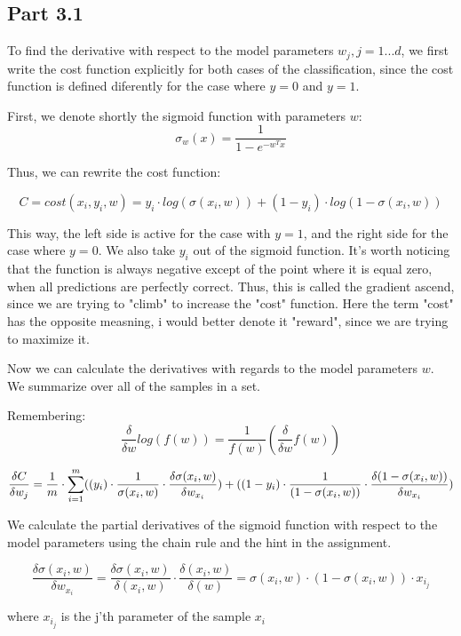 \documentclass[a4paper]{iacas}
\begin{document}
\newpage
\subsection{Part 3.1}

To find the derivative with respect to the model parameters $w_{j}, j = 1... d$, we first write the cost function explicitly for both cases
of the classification, since the cost function is defined diferently for the case where $y = 0$ and $y = 1$.


First, we denote shortly the sigmoid function with parameters $w$:
$$\sigma_{w}(x) = \frac{1}{1 - e^{-w^Tx}}$$

Thus, we can rewrite the cost function:

$$C = cost(x_{i}, y_{i}, w) = y_{i} \cdot log(\sigma(x_{i}, w)) + (1-y_{i} )\cdot log(1-\sigma(x_{i}, w))$$

This way, the left side is active for the case with $y = 1$, and the right side for the case where $y = 0$. We also take $y_{i}$ out of the sigmoid function.
It's worth noticing that the function is always negative except of the point where it is equal zero, when all predictions are perfectly correct. Thus,
this is called the gradient ascend, since we are trying to "climb" to increase the "cost" function. Here the term "cost" has the opposite measning, i would better denote it
"reward", since we are trying to maximize it.

Now we can calculate the derivatives with regards to the model parameters $w$. We summarize over all of the samples in a set.

Remembering:
$$\frac{\delta}{\delta w} log(f(w)) = \frac{1}{f(w)}(\frac{\delta}{\delta w} f(w)) $$

$$\frac{\delta C}{\delta w_j} = \frac{1}{m}  \cdot \sum_{i=1}^{m}  ((y_{i}) \cdot \frac{1}{\sigma(x_{i},w)} \cdot \frac{\delta \sigma(x_{i},w)}{\delta w_{x_{i}}}) + \\ 
((1-y_{i}) \cdot \frac{1}{(1-\sigma(x_{i},w))} \cdot \frac{\delta (1-\sigma(x_{i},w))}{\delta w_{x_{i}}})$$

We calculate the partial derivatives of the sigmoid function with respect to the model parameters using the chain rule and the hint in the assignment.

$$\frac{\delta \sigma(x_{i},w)}{\delta w_{x_{i}}}  = \frac{\delta \sigma(x_{i},w)}{\delta (x_{i},w)} \cdot \frac {\delta (x_{i},w)}{\delta (w)} =  \sigma(x_{i},w) \cdot (1-  \sigma(x_{i},w)) \cdot x_{i_{j}}$$

where $x_{i_{j}}$ is the j'th parameter of the sample $x_{i}$
\end{document}
